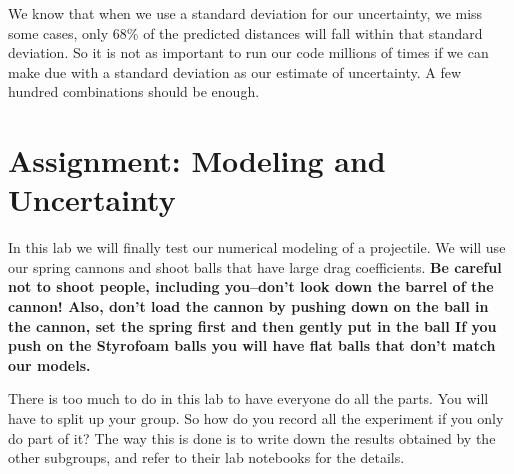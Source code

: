 \documentclass[twoside,11pt,ShortChapTitles]{BYUTextbook}
\begin{document}
We know that when we use a standard deviation for our uncertainty, we miss
some cases, only 68\% of the predicted distances will fall within that
standard deviation. So it is not as important to run our code millions of
times if we can make due with a standard deviation as our estimate of
uncertainty. A few hundred combinations should be enough.\pagebreak

\section{Assignment: Modeling and Uncertainty}

In this lab we will finally test our numerical modeling of a projectile. We
will use our spring cannons and shoot balls that have large drag
coefficients. \textbf{Be careful not to shoot people, including you--don't
look down the barrel of the cannon! Also, don't load the cannon by pushing
down on the ball in the cannon, set the spring first and then gently put in
the ball If you push on the Styrofoam balls you will have flat balls that
don't match our models. }

There is too much to do in this lab to have everyone do all the parts. You
will have to split up your group. So how do you record all the experiment if
you only do part of it? The way this is done is to write down the results
obtained by the other subgroups, and refer to their lab notebooks for the
details.
\end{document}
